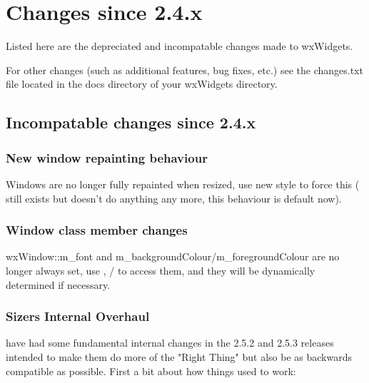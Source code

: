 \section{Changes since 2.4.x}\label{changes}

Listed here are the depreciated and incompatable changes made to wxWidgets.

For other changes (such as additional features, bug fixes, etc.) see the changes.txt file located in the docs directory of your wxWidgets directory.



\subsection{Incompatable changes since 2.4.x}\label{incompatiblesince24}

\subsubsection{New window repainting behaviour}\label{newwindowrepainting}

Windows are no longer fully repainted when resized, use new style  to force this ( still exists but doesn't do anything any more, this behaviour is default now).



\subsubsection{Window class member changes}\label{windowclassmemberchanges}

wxWindow::m\_font and m\_backgroundColour/m\_foregroundColour are no longer always set, use , / to access them, and they will be dynamically determined if necessary.



\subsubsection{Sizers Internal Overhaul}\label{sizersinternaloverhaul}

 have had some fundamental internal changes in the 2.5.2 and 2.5.3 releases intended to make them do more of the "Right Thing" but also be as backwards compatible as possible.  First a bit about how things used to work:

